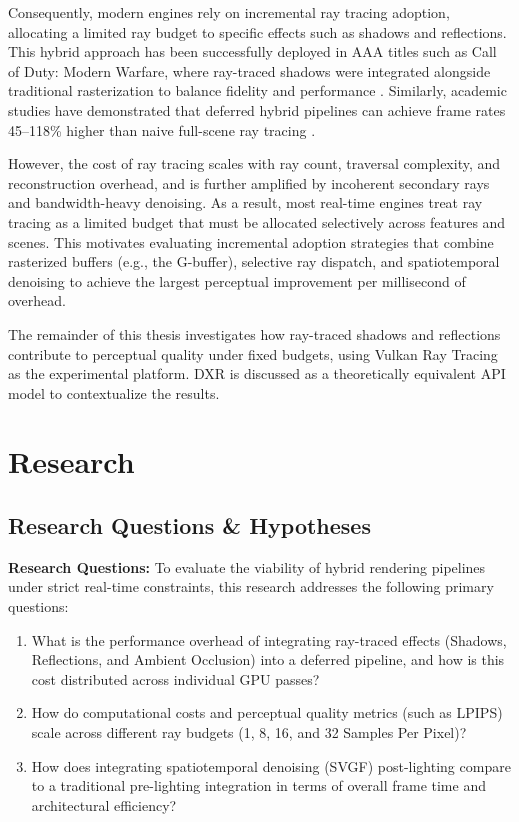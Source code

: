 \documentclass[12pt,a4paper]{report}
\newcommand{\daechapter}[1]{
  \chapter{#1}
}
\newcommand{\daesection}[1]{
  \section{#1}
}
\begin{document}
Consequently, modern engines rely on incremental ray tracing adoption, allocating a limited ray budget to specific effects such as shadows and reflections.
This hybrid approach has been successfully deployed in AAA titles such as Call of Duty: Modern Warfare,
where ray-traced shadows were integrated alongside traditional rasterization to balance fidelity and performance \cite{olejnik2020}.
Similarly, academic studies have demonstrated that deferred hybrid pipelines can achieve frame rates 45--118\% higher than naive full-scene ray tracing \cite{ki2023}.

However, the cost of ray tracing scales with ray count, traversal complexity,
and reconstruction overhead, and is further amplified by incoherent secondary
rays and bandwidth-heavy denoising. As a result, most real-time engines treat
ray tracing as a limited budget that must be allocated selectively across
features and scenes. This motivates evaluating incremental adoption strategies
that combine rasterized buffers (e.g., the G-buffer), selective ray dispatch,
and spatiotemporal denoising to achieve the largest perceptual improvement per
millisecond of overhead.

The remainder of this thesis investigates how ray-traced shadows and
reflections contribute to perceptual quality under fixed budgets, using
Vulkan Ray Tracing as the experimental platform. DXR is discussed as a
theoretically equivalent API model to contextualize the results.

\daechapter{Research}

\daesection{Research Questions \& Hypotheses}
\textbf{Research Questions:}
To evaluate the viability of hybrid rendering pipelines under strict real-time constraints, this research addresses the following primary questions:
\begin{enumerate}
    \item What is the performance overhead of integrating ray-traced effects (Shadows, Reflections, and Ambient Occlusion) into a deferred pipeline, and how is this cost distributed across individual GPU passes?
    \item How do computational costs and perceptual quality metrics (such as LPIPS) scale across different ray budgets (1, 8, 16, and 32 Samples Per Pixel)?
    \item How does integrating spatiotemporal denoising (SVGF) post-lighting compare to a traditional pre-lighting integration in terms of overall frame time and architectural efficiency?
\end{enumerate}
\end{document}
